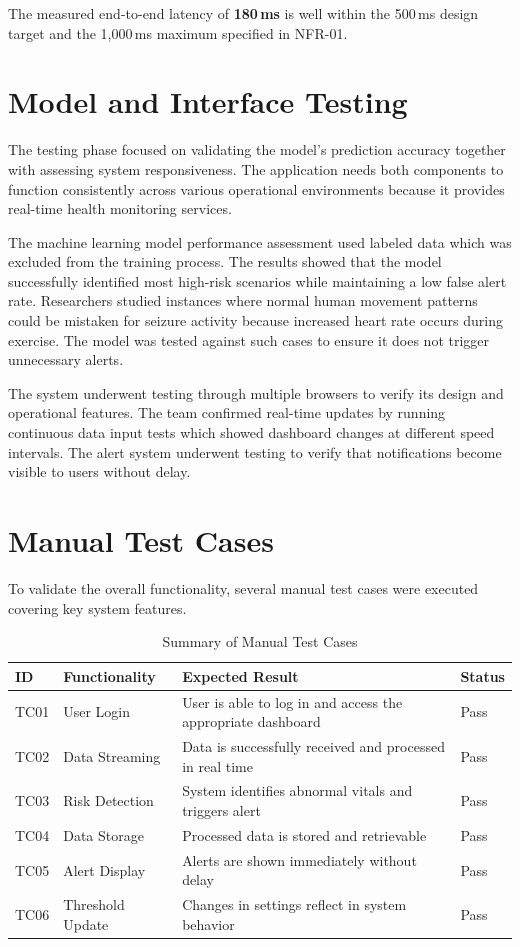 \documentclass[12pt, a4paper, oneside]{report}
\begin{document}
The measured end-to-end latency of \textbf{180\,ms} is well within the 500\,ms design target and the 1,000\,ms maximum specified in NFR-01.


\section{Model and Interface Testing}

The testing phase focused on validating the model's prediction accuracy together with assessing system responsiveness. The application needs both components to function consistently across various operational environments because it provides real-time health monitoring services.

The machine learning model performance assessment used labeled data which was excluded from the training process. The results showed that the model successfully identified most high-risk scenarios while maintaining a low false alert rate. Researchers studied instances where normal human movement patterns could be mistaken for seizure activity because increased heart rate occurs during exercise. The model was tested against such cases to ensure it does not trigger unnecessary alerts.

The system underwent testing through multiple browsers to verify its design and operational features. The team confirmed real-time updates by running continuous data input tests which showed dashboard changes at different speed intervals. The alert system underwent testing to verify that notifications become visible to users without delay.

\section{Manual Test Cases}

To validate the overall functionality, several manual test cases were executed covering key system features.

\begin{table}[h!]
\centering
\small
\begin{tabular}{|p{1.2cm}|p{3.5cm}|p{4.5cm}|p{1.5cm}|}
\hline
\textbf{ID} & \textbf{Functionality} & \textbf{Expected Result} & \textbf{Status} \\ \hline
TC01 & User Login & User is able to log in and access the appropriate dashboard & Pass \\ \hline
TC02 & Data Streaming & Data is successfully received and processed in real time & Pass \\ \hline
TC03 & Risk Detection & System identifies abnormal vitals and triggers alert & Pass \\ \hline
TC04 & Data Storage & Processed data is stored and retrievable & Pass \\ \hline
TC05 & Alert Display & Alerts are shown immediately without delay & Pass \\ \hline
TC06 & Threshold Update & Changes in settings reflect in system behavior & Pass \\ \hline
\end{tabular}
\caption{Summary of Manual Test Cases}
\end{table}
\end{document}
